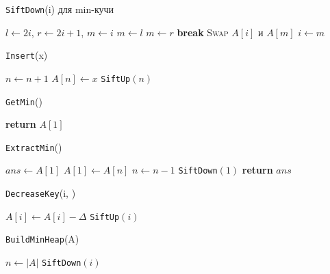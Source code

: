 \documentclass[12pt,a4paper]{article}
\begin{document}
\begin{algorithm}[H]
\caption{\texttt{SiftDown}(i) для min-кучи}
\begin{algorithmic}[1]
  \State $l \gets 2i$, $r \gets 2i+1$, $m \gets i$
   \State $m \gets l$ \EndIf
   \State $m \gets r$ \EndIf
   \State \textbf{break} \EndIf
  \State \textsc{Swap} $A[i]$ и $A[m]$
  \State $i \gets m$
\EndWhile
\end{algorithmic}
\end{algorithm}

\begin{algorithm}[H]
\caption{\texttt{Insert}(x)}
\begin{algorithmic}[1]
\State $n \gets n+1$
\State $A[n] \gets x$
\State \texttt{SiftUp}$(n)$
\end{algorithmic}
\end{algorithm}

\begin{algorithm}[H]
\caption{\texttt{GetMin}()}
\begin{algorithmic}[1]
\State \textbf{return} $A[1]$
\end{algorithmic}
\end{algorithm}

\begin{algorithm}[H]
\caption{\texttt{ExtractMin}()}
\begin{algorithmic}[1]
\State $ans \gets A[1]$
\State $A[1] \gets A[n]$
\State $n \gets n-1$
\State \texttt{SiftDown}$(1)$
\State \textbf{return} $ans$
\end{algorithmic}
\end{algorithm}

\begin{algorithm}[H]
\caption{\texttt{DecreaseKey}(i, \Delta)}
\begin{algorithmic}[1]
\State $A[i] \gets A[i] - \Delta$ 
\State \texttt{SiftUp}$(i)$
\end{algorithmic}
\end{algorithm}

\begin{algorithm}[H]
\caption{\texttt{BuildMinHeap}(A)}
\begin{algorithmic}[1]
\State $n \gets |A|$
  \State \texttt{SiftDown}$(i)$
\EndFor
\end{algorithmic}
\end{algorithm}
\end{document}
